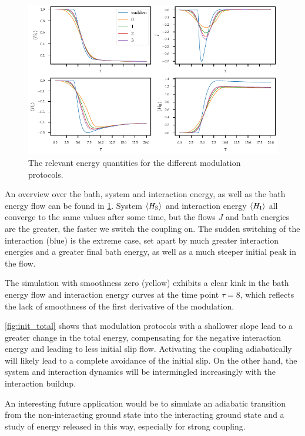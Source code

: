 \begin{figure}[htp]
  \centering
  \includegraphics{figs/one_bath_mod/init_overview}
  \caption{\label{fig:init_energies}The relevant energy quantities for
    the different modulation protocols.}
\end{figure}
An overview over the bath, system and interaction energy, as well as
the bath energy flow can be found in \cref{fig:init_energies}. System
\(\ev{H_{\sys}}\) and interaction energy \(\ev{H_{\inter}}\) all
converge to the same values after some time, but the flows \(J\) and
bath energies are the greater, the faster we switch the coupling
on. The sudden switching of the interaction (blue) is the extreme
case, set apart by much greater interaction energies and a greater
final bath energy, as well as a much steeper initial peak in the flow.

The simulation with smoothness zero (yellow) exhibits a clear kink in
the bath energy flow and interaction energy curves at the time point
\(τ=8\), which reflects the lack of smoothness of the first derivative
of the modulation.

\cref{fig:init_total} shows that modulation protocols with a shallower
slope lead to a greater change in the total energy, compensating for
the negative interaction energy and leading to less initial
slip flow. Activating the coupling adiabatically will likely lead to a
complete avoidance of the initial slip. On the other hand, the system
and interaction dynamics will be intermingled increasingly with the
interaction buildup.

An interesting future application would be to simulate an adiabatic
transition from the non-interacting ground state into the interacting
ground state and a study of energy released in this way, especially
for strong coupling.


